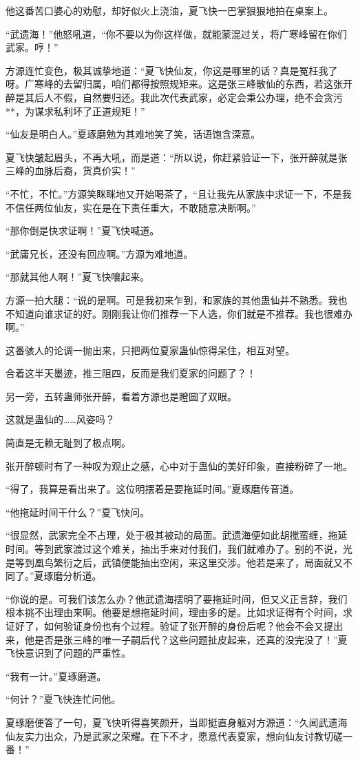 \begin{this_body}
他这番苦口婆心的劝慰，却好似火上浇油，夏飞快一巴掌狠狠地拍在桌案上。

“武遗海！”他怒吼道，“你不要以为你这样做，就能蒙混过关，将广寒峰留在你们武家。哼！”

方源连忙变色，极其诚挚地道：“夏飞快仙友，你这是哪里的话？真是冤枉我了呀。广寒峰的去留归属，咱们都得按照规矩来。这是张三峰散仙的东西，若这张开醉是其后人不假，自然要归还。我此次代表武家，必定会秉公办理，绝不会贪污**，为谋求私利坏了正道规矩！”

“仙友是明白人。”夏琢磨勉为其难地笑了笑，话语饱含深意。

夏飞快皱起眉头，不再大吼，而是道：“所以说，你赶紧验证一下，张开醉就是张三峰的血脉后裔，货真价实！”

“不忙，不忙。”方源笑眯眯地又开始喝茶了，“且让我先从家族中求证一下，不是我不信任两位仙友，实在是在下责任重大，不敢随意决断啊。”

“那你倒是快求证啊！”夏飞快喊道。

“武庸兄长，还没有回应啊。”方源为难地道。

“那就其他人啊！”夏飞快嚷起来。

方源一拍大腿：“说的是啊。可是我初来乍到，和家族的其他蛊仙并不熟悉。我也不知道向谁求证的好。刚刚我让你们推荐一下人选，你们就是不推荐。我也很难办啊。”

这番骇人的论调一抛出来，只把两位夏家蛊仙惊得呆住，相互对望。

合着这半天墨迹，推三阻四，反而是我们夏家的问题了？！

另一旁，五转蛊师张开醉，看着方源也是瞪圆了双眼。

这就是蛊仙的……风姿吗？

简直是无赖无耻到了极点啊。

张开醉顿时有了一种叹为观止之感，心中对于蛊仙的美好印象，直接粉碎了一地。

“得了，我算是看出来了。这位明摆着是要拖延时间。”夏琢磨传音道。

“他拖延时间干什么？”夏飞快问。

“很显然，武家完全不占理，处于极其被动的局面。武遗海便如此胡搅蛮缠，拖延时间。等到武家渡过这个难关，抽出手来对付我们，我们就难办了。别的不说，光是等到凰鸟繁衍之后，武镇便能抽出空闲，来这里交涉。他若是来了，局面就又不同了。”夏琢磨分析道。

“你说的是。可我们该怎么办？他武遗海摆明了要拖延时间，但又义正言辞，我们根本挑不出理由来啊。他要是想拖延时间，理由多的是。比如求证得有个时间，求证好了，如何验证身份也有个过程。验证了张开醉的身份后呢？他会不会又提出来，他是否是张三峰的唯一子嗣后代？这些问题扯皮起来，还真的没完没了！”夏飞快意识到了问题的严重性。

“我有一计。”夏琢磨道。

“何计？”夏飞快连忙问他。

夏琢磨便答了一句，夏飞快听得喜笑颜开，当即挺直身躯对方源道：“久闻武遗海仙友实力出众，乃是武家之荣耀。在下不才，愿意代表夏家，想向仙友讨教切磋一番！”

\end{this_body}

